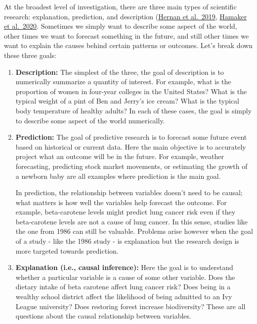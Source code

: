 \documentclass[
]{book}
\begin{document}
At the broadest level of investigation, there are three main types of scientific research: explanation, prediction, and description (\href{https://www.tandfonline.com/doi/full/10.1080/09332480.2019.1579578}{Hernan et al.~2019}, \href{https://www.sciencedirect.com/science/article/pii/S1878929320301171}{Hamaker et al.~2020}. Sometimes we simply want to describe some aspect of the world, other times we want to forecast something in the future, and still other times we want to explain the causes behind certain patterns or outcomes. Let's break down these three goals:

\begin{enumerate}
\def\labelenumi{\arabic{enumi}.}
\item
  \textbf{Description:} The simplest of the three, the goal of description is to numerically summarize a quantity of interest. For example, what is the proportion of women in four-year colleges in the United States? What is the typical weight of a pint of Ben and Jerry's ice cream? What is the typical body temperature of healthy adults? In each of these cases, the goal is simply to describe some aspect of the world numerically.
\item
  \textbf{Prediction:} The goal of predictive research is to forecast some future event based on historical or current data. Here the main objective is to accurately project what an outcome will be in the future. For example, weather forecasting, predicting stock market movements, or estimating the growth of a newborn baby are all examples where prediction is the main goal.

  In prediction, the relationship between variables doesn't need to be causal; what matters is how well the variables help forecast the outcome. For example, beta-carotene levels might predict lung cancer risk even if they beta-carotene levels are not a cause of lung cancer. In this sense, studies like the one from 1986 can still be valuable. Problems arise however when the goal of a study - like the 1986 study - is explanation but the research design is more targeted towards prediction.
\item
  \textbf{Explanation (i.e., causal inference):} Here the goal is to understand whether a particular variable is a cause of some other variable. Does the dietary intake of beta carotene affect lung cancer risk? Does being in a wealthy school district affect the likelihood of being admitted to an Ivy League university? Does restoring forest increase biodiversity? These are all questions about the causal relationship between variables.


\end{enumerate}
\end{document}

